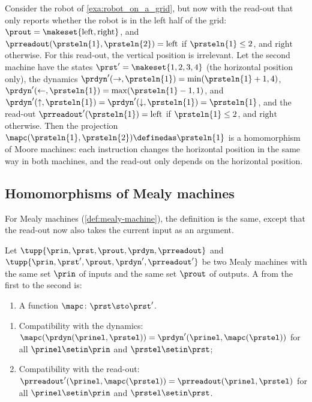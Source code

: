 \begin{example}
    \label{exa:moore-robot-projection}
    Consider the robot of \cref{exa:robot_on_a_grid}, but now with the read-out that only reports whether the robot is in the left half of the grid: $\prout = \makeset{\text{left}, \text{right}}$, and $\prreadout(\prsteln{1}, \prsteln{2}) = \text{left}$ if $\prsteln{1} \leq 2$, and $\text{right}$ otherwise.
    For this read-out, the vertical position is irrelevant.
    Let the second machine have the states $\prst' = \makeset{1, 2, 3, 4}$ (the horizontal position only), the dynamics $\prdyn'(\rightarrow, \prsteln{1}) = \min(\prsteln{1} + 1, 4)$, $\prdyn'(\leftarrow, \prsteln{1}) = \max(\prsteln{1} - 1, 1)$, and $\prdyn'(\uparrow, \prsteln{1}) = \prdyn'(\downarrow, \prsteln{1}) = \prsteln{1}$, and the read-out $\prreadout'(\prsteln{1}) = \text{left}$ if $\prsteln{1} \leq 2$, and $\text{right}$ otherwise.
    Then the projection $\mapc(\prsteln{1}, \prsteln{2}) \definedas \prsteln{1}$ is a homomorphism of Moore machines: each instruction changes the horizontal position in the same way in both machines, and the read-out only depends on the horizontal position.
\end{example}


\subsection{Homomorphisms of Mealy machines}
\label{sec:homomorphisms-mealy}

For Mealy machines (\cref{def:mealy-machine}), the definition is the same, except that the read-out now also takes the current input as an argument.

\begin{ctdefinition}
    \label{def:mealy-machine-homomorphism}
    Let $\tupp{\prin, \prst, \prout, \prdyn, \prreadout}$ and $\tupp{\prin, \prst', \prout, \prdyn', \prreadout'}$ be two Mealy machines with the same set $\prin$ of inputs and the same set $\prout$ of outputs.
    A  from the first to the second is:

    \constit
    \begin{enumerate}
        \item A function $\mapc \colon \prst \sto \prst'$.
    \end{enumerate}

    \condit
    \begin{enumerate}
        \item Compatibility with the dynamics: $\mapc(\prdyn(\prinel, \prstel)) = \prdyn'(\prinel, \mapc(\prstel))$ for all $\prinel \setin \prin$ and $\prstel \setin \prst$;
        \item Compatibility with the read-out: $\prreadout'(\prinel, \mapc(\prstel)) = \prreadout(\prinel, \prstel)$ for all $\prinel \setin \prin$ and $\prstel \setin \prst$.
    \end{enumerate}
\end{ctdefinition}

